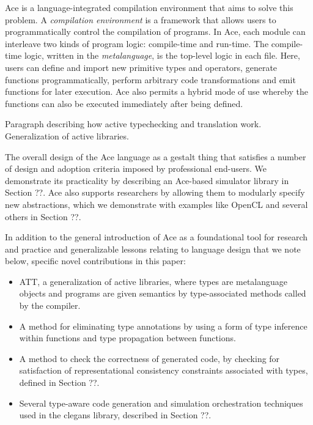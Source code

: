 \documentclass[10pt, conference, compsocconf]{IEEEtran}
\begin{document}
Ace is a language-integrated compilation environment that aims to solve this problem. A {\em compilation environment} is a framework that allows users to programmatically control the compilation of programs. In Ace, each module can interleave two kinds  of program logic: compile-time and run-time. The compile-time logic, written in the {\em metalanguage}, is the top-level logic in each file. Here, users can define and import new primitive types and operators, generate functions programmatically, perform arbitrary code transformations and emit functions for later execution. Ace also permits a hybrid mode of use whereby the functions can also be executed immediately after being defined. 

Paragraph describing how active typechecking and translation work. Generalization of active libraries. 

The overall design of the Ace language as a gestalt thing that satisfies a number of design and adoption criteria imposed by professional end-users. We demonstrate its practicality by describing an Ace-based simulator library in Section ??. Ace also supports researchers by allowing them to modularly specify new abstractions, which we demonstrate with examples like OpenCL and several others in Section ??. 

In addition to the general introduction of Ace as a foundational tool for research and practice and generalizable lessons relating to language design that we note below, specific novel contributions in this paper: 

\begin{itemize}
\item ATT, a generalization of active libraries, where types are metalanguage objects and programs are given semantics by type-associated methods called by the compiler.
\item A method for eliminating type annotations by using a form of type inference within functions and type propagation between functions.
\item A method to check the correctness of generated code, by checking for satisfaction of representational consistency constraints associated with types, defined in Section ??. 
\item Several type-aware code generation and simulation orchestration techniques used in the clegans library, described in Section ??.
\end{itemize}
\end{document}
